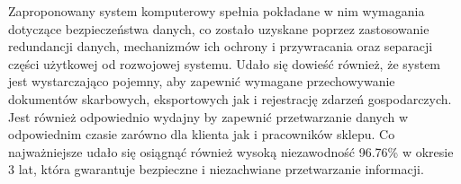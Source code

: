 	\par Zaproponowany system komputerowy spełnia pokładane w nim wymagania dotyczące bezpieczeństwa danych, co zostało uzyskane poprzez zastosowanie redundancji danych, mechanizmów ich ochrony i przywracania oraz separacji części użytkowej od rozwojowej systemu. Udało się dowieść również, że system jest wystarczająco pojemny, aby zapewnić wymagane przechowywanie dokumentów skarbowych, eksportowych jak i rejestrację zdarzeń gospodarczych. Jest również odpowiednio wydajny by zapewnić przetwarzanie danych w odpowiednim czasie zarówno dla klienta jak i pracowników sklepu. Co najważniejsze udało się osiągnąć również wysoką niezawodność 96.76\% w okresie 3 lat, która gwarantuje bezpieczne i niezachwiane przetwarzanie informacji.
 
